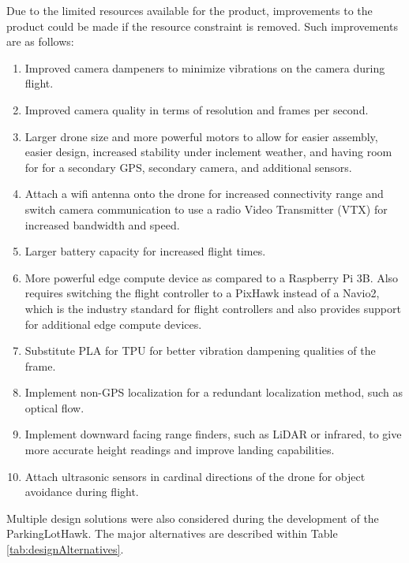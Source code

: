 \documentclass[12pt, titlepage]{article}
\begin{document}
Due to the limited resources available for the product, improvements to the product could be made if the resource constraint is removed. Such improvements are as follows:
\begin{enumerate}
    \item Improved camera dampeners to minimize vibrations on the camera during flight.
    \item Improved camera quality in terms of resolution and frames per second.
    \item Larger drone size and more powerful motors to allow for easier assembly, easier design, increased stability under inclement weather, and having room for for a secondary GPS, secondary camera, and additional sensors.
    \item Attach a wifi antenna onto the drone for increased connectivity range and switch camera communication to use a radio Video Transmitter (VTX) for increased bandwidth and speed.
    \item Larger battery capacity for increased flight times.
    \item More powerful edge compute device as compared to a Raspberry Pi 3B. Also requires switching the flight controller to a PixHawk instead of a Navio2, which is the industry standard for flight controllers and also provides support for additional edge compute devices.
    \item Substitute PLA for TPU for better vibration dampening qualities of the frame.
    \item Implement non-GPS localization for a redundant localization method, such as optical flow.
    \item Implement downward facing range finders, such as LiDAR or infrared, to give more accurate height readings and improve landing capabilities.
    \item Attach ultrasonic sensors in cardinal directions of the drone for object avoidance during flight.
\end{enumerate}

Multiple design solutions were also considered during the development of the ParkingLotHawk. The major alternatives are described within Table \ref{tab:designAlternatives}.
\end{document}

